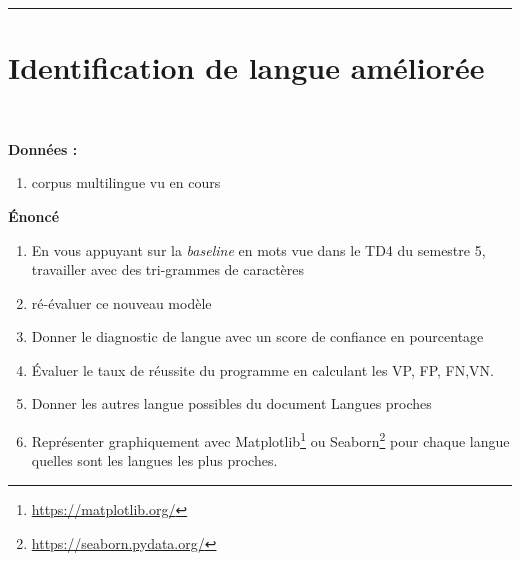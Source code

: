 \newcommand{\numTD}{TD1}
\newcommand{\themeTD}{Analyse en caractères}
\newcommand{\file}{toto.tex}



\hrule

\noindent{}
\newline
\section{Identification de langue améliorée}
~\\
\vspace{-1cm}

\textbf{Données :}
\begin{enumerate}
  \item corpus multilingue vu en cours
\end{enumerate}

\textbf{Énoncé}

\begin{enumerate}
  \item En vous appuyant sur la \textit{baseline} en mots vue dans le TD4 du semestre 5, travailler avec des tri-grammes de caractères
  \item ré-évaluer ce nouveau modèle
  \item Donner le diagnostic de langue avec un score de confiance en pourcentage
  \item Évaluer le taux de réussite du programme en calculant les VP, FP, FN,VN.
  \item Donner les autres langue possibles du document  Langues proches
  \item Représenter graphiquement avec Matplotlib\footnote{\url{https://matplotlib.org/}} ou Seaborn\footnote{\url{https://seaborn.pydata.org/}} pour chaque langue quelles sont les langues les plus proches.
\end{enumerate}


